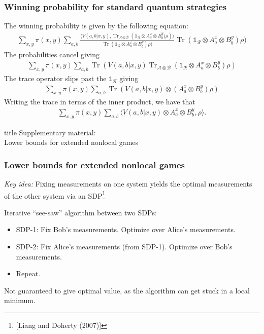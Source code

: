 \documentclass{beamer}
\def\I{\mathds{1}}
\newcommand{\ip}[2]{\langle #1 , #2\rangle}
\newcommand{\biggip}[2]{\biggl\langle #1, #2 \biggr\rangle}
\newcommand{\tr}{\operatorname{Tr}}
\def\A{\mathcal{A}}
\def\B{\mathcal{B}}
\def\R{\mathcal{R}}
\begin{document}
\begin{frame}[noframenumbering]
	\frametitle{Winning probability for standard quantum strategies}
	The winning probability is given by the following equation:
	\small{
	\begin{align*}
		\sum_{x,y} \pi(x,y) \sum_{a,b} \frac{ \ip{V(a,b|x,y)}{\tr_{\A\otimes\B}\left(\I_{\R} \otimes A_a^x \otimes B_b^y)\rho\right)} }{\tr(\I_{\R} \otimes A_a^x \otimes B_b^y) \rho)} \tr(\I_{\R} \otimes A_a^x \otimes B_b^y) \rho)
	\end{align*}
The probabilities cancel giving 
\begin{align*}
	\sum_{x,y} \pi(x,y) \sum_{a,b} \tr \left( V(a,b|x,y) \tr_{\A \otimes \B} \left( \I_{\R} \otimes A_a^x \otimes B_b^y \right) \rho \right)
\end{align*}
The trace operator slips past the $\I_{\R}$ giving
\begin{align*}
	\sum_{x,y} \pi(x,y) \sum_{a,b} \tr \left( V(a,b|x,y) \otimes (A_a^x \otimes B_b^y)\rho \right)
\end{align*}
Writing the trace in terms of the inner product, we have that 
\begin{align*}
	\sum_{x,y} \pi(x,y) \sum_{a,b} \biggip{V(a,b|x,y) \otimes A_a^x \otimes B_b^y}{\rho}.
\end{align*}
	}
\end{frame}


  \begin{frame}[noframenumbering]
  \vfill
  \centering
  \begin{beamercolorbox}[sep=8pt,center,shadow=true,rounded=true]{title}
    Supplementary material: \\ Lower bounds for extended nonlocal games
  \end{beamercolorbox}
  \vfill
  \end{frame}
  
\begin{frame}[noframenumbering]
	\frametitle{Lower bounds for extended nonlocal games}
	\emph{Key idea:} Fixing measurements on one system yields the optimal measurements of the other system via an SDP\footnote{[Liang and Doherty (2007)]}
	\pause
	\vspace{2mm}
	
	Iterative ``see-saw'' algorithm between two SDPs:
	\begin{itemize}
			\item SDP-1: Fix Bob's measurements. Optimize over Alice's measurements. 
			\item SDP-2: Fix Alice's measurements (from SDP-1). Optimize over Bob's measurements. 
			\item Repeat. 
	\end{itemize}

	Not guaranteed to give optimal value, as the algorithm can get stuck in a local minimum. 	
	
\end{frame}  
  
\end{document}
